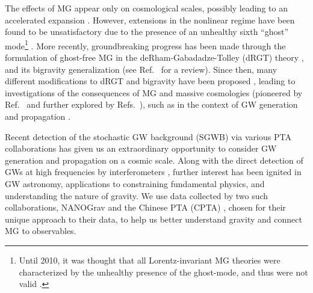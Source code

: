 \documentclass[prd,twocolumn,aps,psfig,nofootinbib,nobibnotes,superscriptaddress,preprintnumbers,times]{revtex4-2}
\begin{document}
The effects of MG appear only on cosmological scales, possibly leading to an accelerated expansion \cite{DAmico:2011eto}.
However, extensions in the nonlinear regime have been found to be unsatisfactory due to the presence of an unhealthy sixth ``ghost'' mode\footnote{Until 2010, it was thought that all Lorentz-invariant MG theories were characterized by the unhealthy presence of the ghost-mode, and thus were not valid \cite{deRham:2010kj}.} \cite{Boulware:1972yco}.
More recently, groundbreaking progress has been made through the formulation of ghost-free MG in the deRham-Gabadadze-Tolley (dRGT) theory \cite{deRham:2010ik,deRham:2010kj}, and its bigravity generalization \cite{Hassan:2011zd} (see Ref.\ \cite{deRham:2023ngf} for a review). Since then, many different modifications to dRGT and bigravity have been proposed \cite{Hinterbichler:2011tt,deRham:2014zqa,Koyama:2015vza,deRham:2016nuf,Hinterbichler:2016try, Cusin:2016ytz, Kenna-Allison:2019tbu, Kazempour:2022giy},  
leading to investigations of the consequences of MG and massive cosmologies (pioneered by Ref.\ \cite{DAmico:2011eto} and further explored by Refs.\ \cite{Gratia:2012wt,Gumrukcuoglu:2012aa,Maeda:2013bha,Akrami:2013pna,Zhang:2013noa,Lambiase:2012fv,Koyama:2011wx,Tasinato:2012ze, Solomon:2014iwa, Akrami:2013ffa,Koennig:2014ods,Gumrukcuoglu:2016hic, Heisenberg:2024uwq, Smirnov:2025yru}), 
such as in the context of GW generation and propagation \cite{DeFelice:2013awa,Gumrukcuoglu:2013nza,DeFelice:2013bxa,DeFelice:2015moy,Babichev:2015xha,Sakstein:2017bws}. 


Recent detection of the stochastic GW background (SGWB) via various PTA collaborations \cite{Agazie:2023, Xu:2023wog,EPTA:2023sfo,EPTA:2023akd,EPTA:2023fyk, Zic:2023gta,Reardon:2023gzh} has given us an extraordinary opportunity to consider GW generation and propagation on a cosmic scale. Along with the direct detection of GWs at high frequencies by interferometers \cite{LIGOScientific:2016aoc,LIGOScientific:2016sjg, KAGRA:2020agh, VIRGO:2014yos}, further interest has been ignited in GW astronomy, applications to constraining fundamental physics, and understanding the nature of gravity. We use data collected by two such collaborations, NANOGrav \cite{Agazie:2023} and the Chinese PTA (CPTA) \cite{Xu:2023wog}, chosen for their unique approach to their data, to help us better understand gravity and connect MG to observables. 
\end{document}
